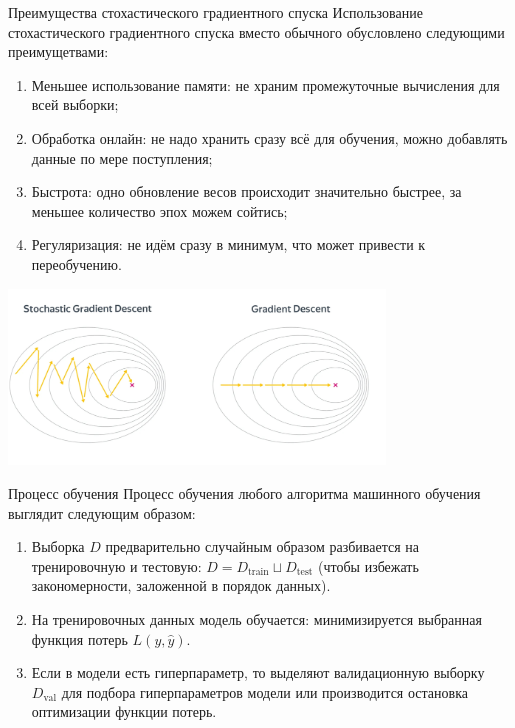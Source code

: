 \documentclass[notheorems, handout]{beamer}
\begin{document}
\begin{frame}{Преимущества стохастического градиентного спуска}
	Использование стохастического градиентного спуска вместо обычного обусловлено следующими преимущетвами:
	\begin{enumerate}
		\item Меньшее использование памяти: не храним промежуточные вычисления для всей выборки;
		\item Обработка онлайн: не надо хранить сразу всё для обучения, можно добавлять данные по мере поступления;
		\item Быстрота: одно обновление весов происходит значительно быстрее, за меньшее количество эпох можем сойтись;
		\item Регуляризация: не идём сразу в минимум, что может привести к переобучению.
	\end{enumerate}

	\begin{center}
		\includegraphics[width=0.75\textwidth]{img/stoch_grad_des.jpg}		
	\end{center}
\end{frame}

\begin{frame}{Процесс обучения}
	Процесс обучения любого алгоритма машинного обучения выглядит следующим образом:
	\begin{enumerate}
		\item Выборка $D$ предварительно случайным образом разбивается на тренировочную и тестовую: $D=D_\text{train} \sqcup D_\text{test}$ (чтобы избежать закономерности, заложенной в порядок данных).\medskip
		\item На тренировочных данных модель обучается: минимизируется выбранная функция потерь $L(y, \hat y)$.\medskip
		\item Если в модели есть гиперпараметр, то выделяют валидационную выборку $D_\text{val}$ для подбора гиперпараметров модели или производится остановка оптимизации функции потерь.
	\end{enumerate}
\end{frame}
\end{document}
